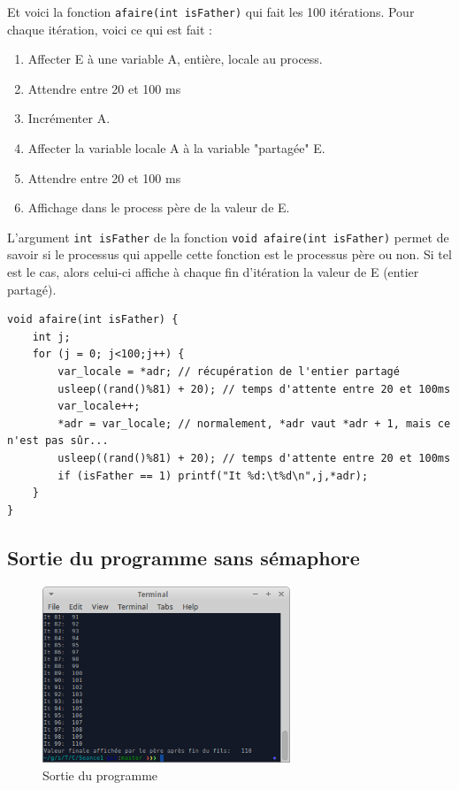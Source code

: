 Et voici la fonction \lstinline{afaire(int isFather)} qui fait les 100 itérations. Pour chaque itération, voici ce qui est fait :
\begin{enumerate}
  \item Affecter E à une variable A, entière, locale au process.
  \item Attendre entre 20 et 100 ms
  \item Incrémenter A.
  \item Affecter la variable locale A à la variable "partagée" E.
  \item Attendre entre 20 et 100 ms
  \item Affichage dans le process père de la valeur de E.
\end{enumerate}

\medskip

L'argument \lstinline{int isFather} de la fonction \lstinline{void afaire(int isFather)} permet de savoir si le processus qui appelle cette fonction est le processus père ou non. Si tel est le cas, alors celui-ci affiche à chaque fin d'itération la valeur de E (entier partagé).

\begin{lstlisting}
void afaire(int isFather) {
    int j;
    for (j = 0; j<100;j++) {
        var_locale = *adr; // récupération de l'entier partagé
        usleep((rand()%81) + 20); // temps d'attente entre 20 et 100ms
        var_locale++;
        *adr = var_locale; // normalement, *adr vaut *adr + 1, mais ce n'est pas sûr...
        usleep((rand()%81) + 20); // temps d'attente entre 20 et 100ms
        if (isFather == 1) printf("It %d:\t%d\n",j,*adr);
    }
}
\end{lstlisting}

\subsection{Sortie du programme sans sémaphore}

\begin{figure}[h!]
  \centering
  \includegraphics[width=0.66\textwidth]{seance2_img1.png}
  \caption{Sortie du programme}
\end{figure}

